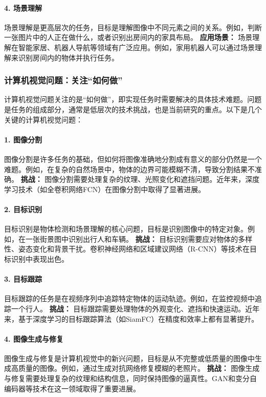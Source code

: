 \paragraph{4. 场景理解}
场景理解是更高层次的任务，目标是理解图像中不同元素之间的关系。例如，判断一张图片中的人正在做什么，或者识别出房间内的家具布局。  
\textbf{应用场景：} 场景理解在智能家居、机器人导航等领域有广泛应用。例如，家用机器人可以通过场景理解来识别房间内的物体并执行任务。

\subsubsection{计算机视觉问题：关注“如何做”}

计算机视觉问题关注的是“如何做”，即实现任务时需要解决的具体技术难题。问题是任务的组成部分，通常是低层次的技术挑战，也是当前研究的重点。以下是几个关键的计算机视觉问题：

\paragraph{1. 图像分割}
图像分割是许多任务的基础，但如何将图像准确地分割成有意义的部分仍然是一个难题。例如，在复杂的自然场景中，物体的边界可能模糊不清，导致分割结果不准确。  
\textbf{挑战：} 图像分割需要处理复杂的纹理、光照变化和遮挡问题。近年来，深度学习技术（如全卷积网络FCN）在图像分割中取得了显著进展。

\paragraph{2. 目标识别}
目标识别是物体检测和场景理解的核心问题，目标是识别图像中的特定对象。例如，在一张街景图中识别出行人和车辆。  
\textbf{挑战：} 目标识别需要应对物体的多样性、姿态变化和背景干扰。卷积神经网络和区域建议网络（R-CNN）等技术在目标识别中表现出色。

\paragraph{3. 目标跟踪}
目标跟踪的任务是在视频序列中追踪特定物体的运动轨迹。例如，在监控视频中追踪一个行人。  
\textbf{挑战：} 目标跟踪需要处理物体的外观变化、遮挡和快速运动。近年来，基于深度学习的目标跟踪算法（如SiamFC）在精度和效率上都有显著提升。

\paragraph{4. 图像生成与修复}
图像生成与修复是计算机视觉中的新兴问题，目标是从不完整或低质量的图像中生成高质量的图像。例如，通过生成对抗网络修复模糊的老照片。  
\textbf{挑战：} 图像生成与修复需要处理复杂的纹理和结构信息，同时保持图像的逼真性。GAN和变分自编码器等技术在这一领域取得了重要进展。

